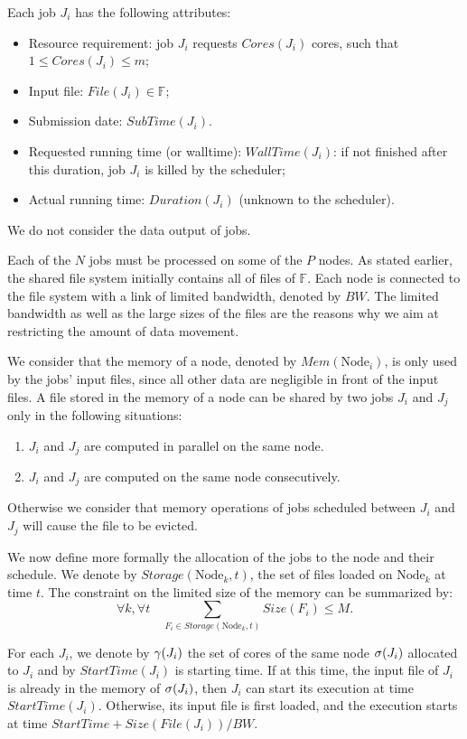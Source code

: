 \documentclass[conference,10pt]{IEEEtran}
\newcommand{\Node}[1]{\ensuremath{\mathrm{Node}_{#1}}\xspace}
\newcommand{\file}{\ensuremath{\mathit{File}}\xspace}
\newcommand{\storage}{\ensuremath{\mathit{Storage}}\xspace}
\newcommand{\size}{\ensuremath{\mathit{Size}}\xspace}
\newcommand{\memory}{\ensuremath{\mathit{Mem}}\xspace}
\newcommand{\duration}{\mathit{Duration}\xspace}
\newcommand{\bandwidth}{\mathit{BW}\xspace}
\newcommand{\core}{\mathit{Cores}\xspace}
\newcommand{\submissiontime}{\mathit{SubTime}\xspace}
\newcommand{\walltime}{\mathit{WallTime}\xspace}
\newcommand{\start}{\mathit{StartTime}\xspace}
\newcommand{\allocatednode}{\ensuremath\mathit{\sigma}\xspace}
\newcommand{\allocatedcores}{\ensuremath\mathit{\gamma}\xspace}
\newcommand{\fileset}{\ensuremath{\mathbb{F}}\xspace}
\begin{document}
Each job $J_i$ has the following attributes:
\begin{itemize}
\item Resource requirement: job $J_i$ requests $\core(J_i)$  cores, such that $1 \leq \core(J_i) \leq m$;
\item Input file: $\file(J_i) \in \fileset$;
\item Submission date: $\submissiontime(J_i)$.
\item Requested running time (or walltime): $\walltime(J_i)$: if not
  finished after this duration, job $J_i$ is killed by the scheduler;
\item Actual running time: $\duration(J_i)$ (unknown to  the scheduler).
\end{itemize}

We do not consider the data output of jobs.

Each of the $N$ jobs must be processed on some of the $P$ nodes.  As
stated earlier, the shared file system initially contains all of files
of $\fileset$.  Each node is connected to the file system with a link
of limited bandwidth, denoted by $\bandwidth$.  The limited bandwidth
as well as the large sizes of the files are the reasons why we aim at
restricting the amount of data movement.

We consider that the memory of a node, denoted by $\memory(\Node{i})$,
is only used by the jobs' input files, since all other data are
negligible in front of the input files.
A file stored in the memory of a node can be shared by two jobs $J_i$ and $J_j$ only in the following situations:
\begin{enumerate}
	\item $J_i$ and $J_j$ are computed in parallel on the same node.
	\item $J_i$ and $J_j$ are computed on the same node consecutively.
\end{enumerate}
Otherwise we consider that memory operations of jobs scheduled between
$J_i$ and $J_j$ will cause the file to be evicted.

We now define more formally the allocation of the jobs to the node and
their schedule.
We denote by $\storage(\Node{k}, t)$, the set of files loaded on $\Node{k}$
at time $t$. The constraint on the limited size of the memory can be
summarized by:
$$
\forall k,\forall t \quad \sum_{F_i\in \storage(\Node{k},t)} \size(F_i)\leq M.
$$

For each $J_i$, we denote by
$\allocatedcores(J_i)$ the set of cores of the same node
$\allocatednode(J_i)$ allocated to $J_i$ and by
$\start(J_i)$ is starting time. If at this time, the input file of
$J_i$ is already in the memory of $\allocatednode(J_i)$, then $J_i$
can start its execution at time $\start(J_i)$. Otherwise, its input
file is first loaded, and the execution starts at time 
$\start+\size(\file(J_i))/\bandwidth$.
\end{document}
